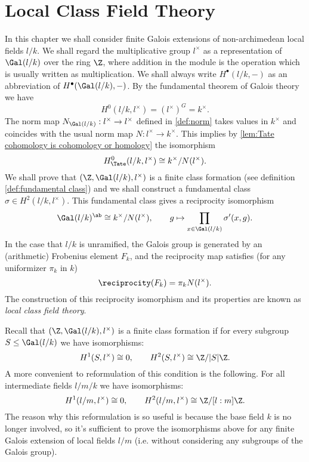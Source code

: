\chapter{Local Class Field Theory}

In this chapter we shall consider finite Galois extensions of non-archimedean local fields $l/k$.
We shall regard the multiplicative group $l^\times$
as a representation of $\Gal(l/k)$ over the ring $\Z$, where
addition in the module is the operation which is usually written as multiplication.
We shall always write $H^\bullet(l/k,-)$ as an abbreviation of $H^\bullet(\Gal(l/k),-)$.
By the fundamental theorem of Galois theory we have
\[
	H^0(l/k,l^\times) = (l^\times)^G = k^\times.
\]
The norm map $N_{\Gal(l/k)} : l^\times \to l^\times$ defined in \ref{def:norm}
takes values in $k^\times$ and coincides with the usual norm map $N : l^\times \to k^\times$. This implies by
\ref{lem:Tate cohomology is cohomology or homology} the isomorphism
\[
	H^0_{\Tate}(l/k,l^\times) \cong k^\times / N(l^\times).
\]
We shall prove that $(\Z,\Gal(l/k),l^\times)$ is a finite class formation (see definition \ref{def:fundamental class}) and we shall construct a
fundamental class $\sigma \in H^2(l/k, l^\times)$.
This fundamental class gives a reciprocity isomorphism
\[
	\Gal(l/k)^{\ab}
	\cong
	k^\times / N(l^\times), \qquad
	g \mapsto \prod_{x \in \Gal(l/k)} \sigma'(x,g).
\]
In the case that $l/k$ is unramified, the Galois group is generated by an
(arithmetic) Frobenius element $F_k$,
and the reciprocity map satisfies (for any uniformizer $\pi_k$ in $k$)
\[
	\reciprocity(F_k) = \pi_k N(l^\times).
\]
The construction of this reciprocity isomorphism and its properties are known as
\emph{local class field theory}.

Recall that $(\Z,\Gal(l/k),l^\times)$ is a finite class formation if for every subgroup
$S \le \Gal(l/k)$ we have isomorphisms:
\[
	H^1(S,l^\times) \cong 0, \qquad H^2(S,l^\times) \cong \Z / |S| \Z.
\]
A more convenient to reformulation of this condition is the following.
For all intermediate fields $l / m / k$ we have isomorphisms:
\[
	H^1(l/m,l^\times) \cong 0, \qquad H^2(l/m,l^\times) \cong \Z / [l:m] \Z.
\]
The reason why this reformulation is so useful is because the base field $k$ is no longer involved,
so it's sufficient to prove the isomorphisms above for any finite Galois extension of local fields $l/m$
(i.e. without considering any subgroups of the Galois group).

